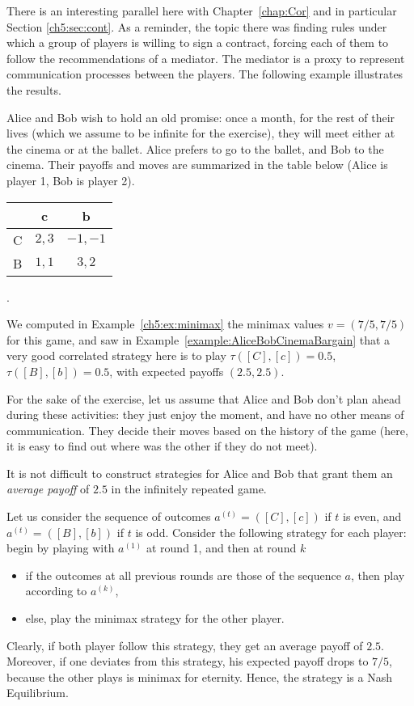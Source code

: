 There is an interesting parallel here with Chapter~\ref{chap:Cor} and in
particular Section \ref{ch5:sec:cont}.
As a reminder, the topic there was finding rules under which a group of
players is willing to sign a contract, forcing each of them to follow the
recommendations of a mediator. The mediator is a proxy to represent
communication processes between the players. The following example
illustrates the results.

\begin{example}
Alice and Bob wish to hold an old promise: once a month, for the rest of
their lives (which we assume to be infinite for the exercise), they will
meet either at the cinema or at the ballet.
Alice prefers to go to the ballet, and Bob to the cinema.
Their payoffs and moves are summarized in the table below (Alice is player
1, Bob is player 2).

\begin{center}
    \begin{tabular}{c | c  c}
          & c & b \\
        \hline
        C & $2, 3$ & $-1, -1$ \\
        B & $1, 1$ & $3, 2$
    \end{tabular}.
\end{center}
We computed in Example~\ref{ch5:ex:minimax} the minimax values
$v = (7/5, 7/5)$ for this game, and saw in
Example~\ref{example:AliceBobCinemaBargain} that a very good correlated
strategy here is to play $\tau([C],[c]) = 0.5$, $\tau([B],[b]) = 0.5$,
with expected payoffs $(2.5,2.5)$.

For the sake of the exercise, let us assume that Alice and Bob don't plan
ahead during these activities: they just enjoy the moment, and have no
other means of communication.
They decide their moves based on the history of the game (here, it is easy
to find out where was the other if they do not meet).

It is not difficult to construct strategies for Alice and Bob that grant
them an \emph{average payoff} of $2.5$ in the infinitely repeated game.

Let us consider the sequence of outcomes $a^{(t)} = ([C],[c])$ if $t$ is
even, and $a^{(t)} = ([B],[b])$ if $t$ is odd.
Consider the following strategy for each player: begin by playing with
$a^{(1)}$ at round 1, and then at round $k$
\begin{itemize}
    \item if the outcomes at all previous rounds are those of the
    sequence $a$, then play according to $a^{(k)}$,
    \item else, play the minimax strategy for the other player.
\end{itemize}
Clearly, if both player follow this strategy, they get an average payoff
of $2.5$. Moreover, if one deviates from this strategy, his expected
payoff drops to $7/5$, because the other plays is minimax for eternity.
Hence, the strategy is a Nash Equilibrium.
\end{example}




